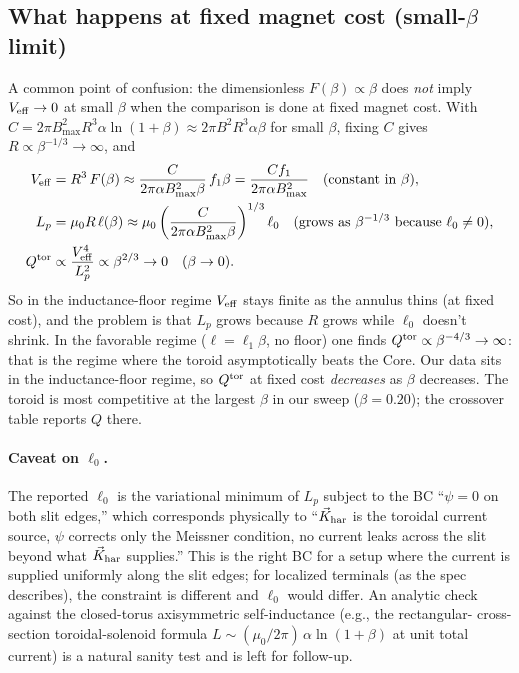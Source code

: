 \documentclass[11pt]{article}
\begin{document}
\subsection{What happens at fixed magnet cost (small-$\beta$ limit)}
\label{sec:fixed-cost}

A common point of confusion: the dimensionless $F(\beta)\propto\beta$
does \emph{not} imply $V_{\rm eff}\to 0$ at small $\beta$ when the
comparison is done at fixed magnet cost.  With
$C=2\pi B_{\max}^2 R^3\alpha\ln(1+\beta)\approx 2\pi B^2 R^3\alpha\beta$
for small $\beta$, fixing $C$ gives $R\propto\beta^{-1/3}\to\infty$,
and
\begin{align}
V_{\rm eff} &= R^3\, F(\beta)
            \approx \frac{C}{2\pi\alpha B_{\max}^2\beta}\,f_1\beta
            = \frac{C f_1}{2\pi\alpha B_{\max}^2}
            \quad\text{(constant in $\beta$)},
            \\
L_p &= \mu_0 R\,\ell(\beta)
     \approx \mu_0\left(\frac{C}{2\pi\alpha B_{\max}^2\beta}\right)^{1/3}\ell_0
     \quad\text{(grows as $\beta^{-1/3}$ because $\ell_0\ne 0$)},
            \\
Q^{\rm tor} &\propto \frac{V_{\rm eff}^4}{L_p^2}
            \propto \beta^{2/3} \to 0 \quad(\beta\to 0).
\end{align}
So in the inductance-floor regime $V_{\rm eff}$ stays finite as the
annulus thins (at fixed cost), and the problem is that $L_p$ grows
because $R$ grows while $\ell_0$ doesn't shrink.  In the favorable
regime ($\ell=\ell_1\beta$, no floor) one finds $Q^{\rm tor}\propto
\beta^{-4/3}\to\infty$: that is the regime where the toroid
asymptotically beats the Core.  Our data sits in the inductance-floor
regime, so $Q^{\rm tor}$ at fixed cost \emph{decreases} as $\beta$
decreases.  The toroid is most competitive at the largest $\beta$ in
our sweep ($\beta=0.20$); the crossover table reports $Q$ there.

\paragraph{Caveat on $\ell_0$.}  The reported $\ell_0$ is the
variational minimum of $L_p$ subject to the BC ``$\psi=0$ on both
slit edges,'' which corresponds physically to ``$\vec K_{\rm har}$
is the toroidal current source, $\psi$ corrects only the Meissner
condition, no current leaks across the slit beyond what
$\vec K_{\rm har}$ supplies.''  This is the right BC for a setup
where the current is supplied uniformly along the slit edges; for
localized terminals (as the spec describes), the constraint is
different and $\ell_0$ would differ.  An analytic check against the
closed-torus axisymmetric self-inductance (e.g., the rectangular-
cross-section toroidal-solenoid formula
$L\sim(\mu_0/2\pi)\,\alpha\ln(1+\beta)$ at unit total current) is a
natural sanity test and is left for follow-up.
\end{document}
